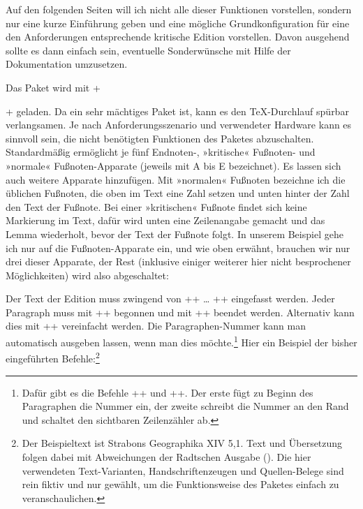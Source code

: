 Auf den folgenden Seiten will ich nicht alle dieser Funktionen vorstellen, sondern nur eine kurze Einführung geben und eine mögliche Grundkonfiguration für eine den Anforderungen entsprechende kritische Edition vorstellen. 
Davon ausgehend sollte es dann einfach sein, eventuelle Sonderwünsche mit Hilfe der Dokumentation umzusetzen.

Das Paket wird mit +\usepackage[<opt>]{reledmac}+ geladen. Da \reledmac ein sehr mächtiges Paket ist, kann es den \TeX-Durchlauf spürbar verlangsamen. Je nach Anforderungsszenario und verwendeter Hardware kann es sinnvoll sein, die nicht benötigten Funktionen des Paketes abzuschalten. Standardmäßig ermöglicht \reledmac je fünf Endnoten-, »kritische« Fußnoten- und »normale« Fußnoten-Apparate 
(jeweils mit A bis E bezeichnet). Es lassen sich auch weitere Apparate hinzufügen. Mit »normalen« Fußnoten bezeichne ich die üblichen Fußnoten, die oben im Text eine Zahl setzen 
und unten hinter der Zahl den Text der Fußnote. Bei einer »kritischen« Fußnote findet sich keine Markierung im Text, dafür wird 
unten eine Zeilenangabe gemacht und das Lemma wiederholt, bevor der Text der Fußnote folgt. In unserem Beispiel gehe ich nur auf die Fußnoten-Apparate ein, und wie oben erwähnt, brauchen wir nur drei dieser Apparate, der Rest 
(inklusive einiger weiterer hier nicht besprochener Möglichkeiten) wird also abgeschaltet:

\begin{lfgwcode}{}
\usepackage[%
  series={A,B,C},%
  noend,         %
  noeledsec,     %
  noledgroup     %
]{reledmac}
\end{lfgwcode}

Der Text der Edition muss zwingend von +\beginnumbering+ \dots{} +\endnumbering+ 
eingefasst werden. Jeder Paragraph muss mit +\pstart+ begonnen und mit +\pend+ beendet 
werden. Alternativ kann dies mit +\autopar+ vereinfacht werden. \cite[17]{reledmac} Die Paragraphen-Nummer kann man automatisch ausgeben lassen, wenn man dies 
möchte.\footnote{Dafür gibt es die Befehle +\numberpstarttrue+ und +\sidepstartnumtrue+. 
  Der erste fügt zu Beginn des Paragraphen die Nummer ein, der zweite schreibt die Nummer an 
den Rand und schaltet den sichtbaren Zeilenzähler ab.} 
Hier ein Beispiel der bisher eingeführten Befehle:\footnote{Der Beispieltext ist Strabons Geographika XIV 5,1. 
Text und Übersetzung folgen dabei mit Abweichungen der Radtschen Ausgabe (\cite[96\psq]{radt:strabon4}). 
Die hier verwendeten Text-Varianten, Handschriftenzeugen und Quellen-Belege sind rein 
fiktiv und nur gewählt, um die Funktionsweise des Paketes \reledmac einfach zu veranschaulichen.}

